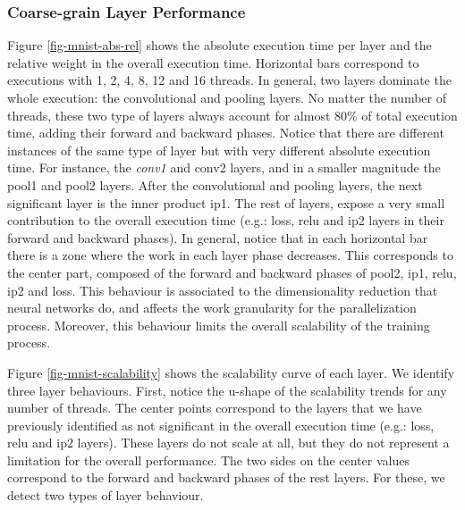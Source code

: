 \subsubsection{Coarse-grain Layer Performance}
Figure \ref{fig-mnist-abs-rel} shows the absolute execution time per layer 
and the relative weight in the overall execution time. Horizontal bars 
correspond to executions with 1, 2, 4, 8, 12 and 16 threads. In general, 
two layers dominate the whole execution: the convolutional and pooling 
layers. No matter the number of threads, these two type of layers always 
account for almost 80\% of total execution time, adding their forward 
and backward phases. Notice that there are different instances of the 
same type of layer but with very different absolute execution time. 
For instance, the \emph{conv1} and conv2 layers, and in a smaller magnitude 
the pool1 and pool2 layers. After the convolutional and pooling layers, 
the next significant layer is the inner product ip1. The rest of layers, 
expose a very small contribution to the overall execution time 
(e.g.: loss, relu and ip2 layers in their forward and backward phases).
In general, notice that in each horizontal bar there is a zone where the 
work in each layer phase decreases. This corresponds to the center part, 
composed of the forward and backward phases of pool2, ip1, relu, ip2 and loss.
This behaviour is associated to the dimensionality reduction that neural 
networks do, and affects the work granularity for the parallelization process.
Moreover, this behaviour limits the overall scalability of the training process.

Figure \ref{fig-mnist-scalability} shows the scalability curve of each layer. 
We identify three layer behaviours. First, notice the u-shape of the 
scalability trends for any number of threads. The center points 
correspond to the layers that we have previously identified as not 
significant in the overall execution time (e.g.: loss, relu and ip2 layers). 
These layers do not scale at all, but they do not represent a limitation for 
the overall performance. The two sides on the center values correspond 
to the forward and backward phases of the rest layers. For these, we detect 
two types of layer behaviour. 

